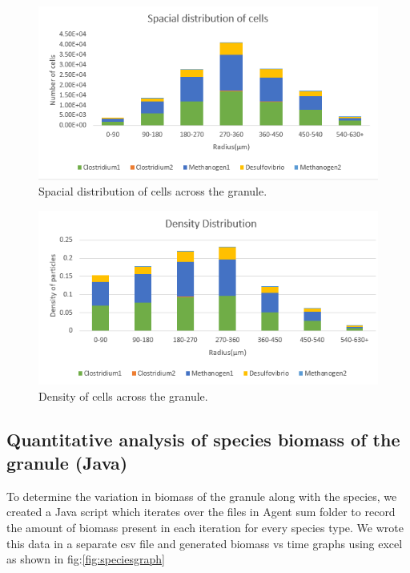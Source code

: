 \begin{figure}[htbp]
\centering
\includegraphics[width=1.0\textwidth]{images/spacial1.PNG}
\caption{Spacial distribution of cells across the granule.}
\label{fig:spacial1}
\end{figure}
\begin{figure}[htbp]
\centering
\includegraphics[width=1.0\textwidth]{images/spacial2.PNG}
\caption{Density of cells across the granule.}
\label{fig:spacial2}
\end{figure}



\subsection{Quantitative analysis of species biomass of the granule (Java)}

To determine the variation in biomass of the granule along with the species, we created a Java script which iterates over the files in Agent sum folder to record the amount of biomass present in each iteration for every species type. We wrote this data in a separate csv file and generated biomass vs time graphs using excel as shown in fig:\ref{fig:speciesgraph}

